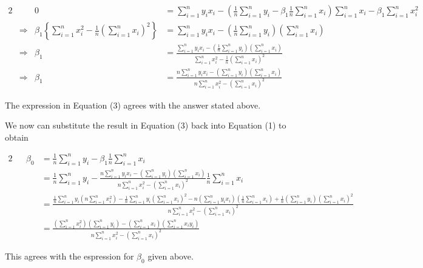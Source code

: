 \documentclass[]{article}
\begin{document}
\begin{alignat}{2}
& & 0 &= \sum_{i = 1}^n y_i x_i - \left(\frac{1}{n}\sum_{i = 1}^n y_i - \beta_1 \frac{1}{n} \sum_{i = 1}^n x_i\right) \sum_{i = 1}^n x_i - \beta_1 \sum_{i = 1}^n x_i^2 \nonumber \\
&\Rightarrow & \beta_1 \left\{\sum_{i = 1}^n x_i^2 - \frac{1}{n} \left(\sum_{i = 1}^n x_i \right)^2 \right\} &= \sum_{i = 1}^n y_i x_i - \left(\frac{1}{n}\sum_{i = 1}^n y_i \right) \left(\sum_{i = 1}^n x_i \right) \nonumber \\
&\Rightarrow & \beta_1 &= \frac{\sum_{i = 1}^n y_i x_i - \left(\frac{1}{n}\sum_{i = 1}^n y_i \right) \left(\sum_{i = 1}^n x_i \right)}{\sum_{i = 1}^n x_i^2 - \frac{1}{n} \left(\sum_{i = 1}^n x_i \right)^2 } \nonumber \\
&\Rightarrow & \beta_1 &= \frac{n\sum_{i = 1}^n y_i x_i - \left(\sum_{i = 1}^n y_i \right) \left(\sum_{i = 1}^n x_i \right)}{n\sum_{i = 1}^n x_i^2 - \left(\sum_{i = 1}^n x_i \right)^2 }
\end{alignat}

The expression in Equation (3) agrees with the answer stated above.

We now can substitute the result in Equation (3) back into Equation (1)
to obtain

\begin{alignat*}{2}
& & \beta_0 &= \frac{1}{n}\sum_{i = 1}^n y_i - \beta_1 \frac{1}{n} \sum_{i = 1}^n x_i \\
& & &= \frac{1}{n}\sum_{i = 1}^n y_i - \frac{n\sum_{i = 1}^n y_i x_i - \left(\sum_{i = 1}^n y_i \right) \left(\sum_{i = 1}^n x_i \right)}{n\sum_{i = 1}^n x_i^2 - \left(\sum_{i = 1}^n x_i \right)^2 } \frac{1}{n} \sum_{i = 1}^n x_i \\
& & &= \frac{\frac{1}{n}\sum_{i = 1}^n y_i\left(n\sum_{i = 1}^n x_i^2\right) - \frac{1}{n}\sum_{i = 1}^n y_i \left(\sum_{i = 1}^n x_i \right)^2 -n \left(\sum_{i = 1}^n y_i x_i\right) \left(\frac{1}{n} \sum_{i = 1}^n x_i \right) + \frac{1}{n}\left(\sum_{i = 1}^n y_i \right)  \left(\sum_{i = 1}^n x_i \right)^2}{n\sum_{i = 1}^n x_i^2 - \left(\sum_{i = 1}^n x_i \right)^2 } \\
& & &= \frac{\left(\sum_{i = 1}^n x_i^2\right) \left(\sum_{i = 1}^n y_i\right) - \left(\sum_{i = 1}^n x_i\right) \left(\sum_{i = 1}^n x_i y_i \right)}{n \sum_{i = 1}^n x_i^2 - \left(\sum_{i = 1}^n x_i\right)^2}
\end{alignat*}

This agrees with the espression for \(\beta_0\) given above.
\end{document}
